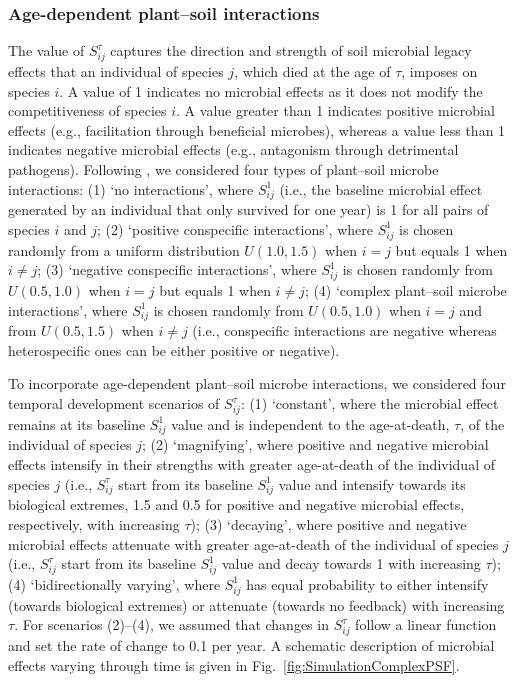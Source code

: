 \subsubsection*{Age-dependent plant--soil interactions}
The value of $S_{ij}^{\tau}$ captures the direction and strength of soil microbial legacy effects that an individual of species $j$, which died at the age of $\tau$, imposes on species $i$. A value of 1 indicates no microbial effects as it does not modify the competitiveness of species $i$. A value greater than 1 indicates positive microbial effects (e.g., facilitation through beneficial microbes), whereas a value less than 1 indicates negative microbial effects (e.g., antagonism through detrimental pathogens). Following \citet{Fukami2013}, we considered four types of plant--soil microbe interactions: 
(1) `no interactions', where $S_{ij}^{1}$ (i.e., the baseline microbial effect generated by an individual that only survived for one year) is 1 for all pairs of species $i$ and $j$; 
(2) `positive conspecific interactions', where $S_{ij}^{1}$ is chosen randomly from a uniform distribution $U\left ( 1.0, 1.5 \right )$ when $i = j$ but equals 1 when $i \neq j$; 
(3) `negative conspecific interactions', where $S_{ij}^{1}$ is chosen randomly from $U\left ( 0.5, 1.0 \right )$ when $i = j$ but equals 1 when $i \neq j$; 
(4) `complex plant--soil microbe interactions', where $S_{ij}^{1}$ is chosen randomly from $U\left ( 0.5, 1.0 \right )$ when $i = j$ and from $U\left ( 0.5, 1.5 \right )$ when $i \neq j$ (i.e., conspecific interactions are negative whereas heterospecific ones can be either positive or negative).
\par


To incorporate age-dependent plant--soil microbe interactions, we considered four temporal development scenarios of $S_{ij}^{\tau}$: 
(1) `constant', where the microbial effect remains at its baseline $S_{ij}^{1}$ value and is independent to the age-at-death, $\tau$, of the individual of species $j$; 
(2) `magnifying', where positive and negative microbial effects intensify in their strengths with greater age-at-death of the individual of species $j$ (i.e., $S_{ij}^{\tau}$ start from its baseline $S_{ij}^{1}$ value and intensify towards its biological extremes, 1.5 and 0.5 for positive and negative microbial effects, respectively, with increasing $\tau$); 
(3) `decaying', where positive and negative microbial effects attenuate with greater age-at-death of the individual of species $j$ (i.e., $S_{ij}^{\tau}$ start from its baseline $S_{ij}^{1}$ value and decay towards 1 with increasing $\tau$); 
(4) `bidirectionally varying', where $S_{ij}^{1}$ has equal probability to either intensify (towards biological extremes) or attenuate (towards no feedback) with increasing $\tau$.
For scenarios (2)--(4), we assumed that changes in $S_{ij}^{\tau}$ follow a linear function and set the rate of change to 0.1 per year. 
A schematic description of microbial effects varying through time is given in Fig.~\ref{fig:SimulationComplexPSF}.
\par


